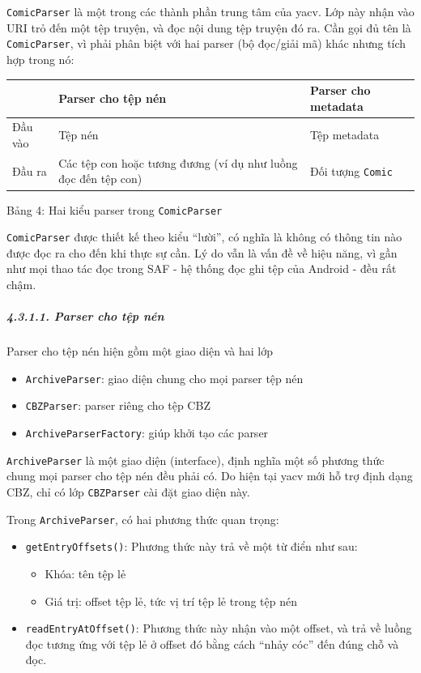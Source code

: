 \documentclass[
]{article}
\begin{document}
\texttt{ComicParser} là một trong các thành phần trung tâm của yacv. Lớp
này nhận vào URI trỏ đến một tệp truyện, và đọc nội dung tệp truyện đó
ra. Cần gọi đủ tên là \texttt{ComicParser}, vì phải phân biệt với hai
parser (bộ đọc/giải mã) khác nhưng tích hợp trong nó:

\begin{longtable}[]{@{}
  >{\raggedright\arraybackslash}p{}
  >{\raggedright\arraybackslash}p{}
  >{\raggedright\arraybackslash}p{}@{}}
\toprule
& Parser cho tệp nén & Parser cho metadata \\
\midrule
\endhead
Đầu vào & Tệp nén & Tệp metadata \\
Đầu ra & Các tệp con hoặc tương đương (ví dụ như luồng đọc đến tệp con)
& Đối tượng \texttt{Comic} \\
\bottomrule
\end{longtable}

Bảng 4: Hai kiểu parser trong \texttt{ComicParser}

\texttt{ComicParser} được thiết kế theo kiểu ``lười'', có nghĩa là không
có thông tin nào được đọc ra cho đến khi thực sự cần. Lý do vẫn là vấn
đề về hiệu năng, vì gần như mọi thao tác đọc trong SAF - hệ thống đọc
ghi tệp của Android - đều rất chậm.

\hypertarget{parser-cho-tux1ec7p-nuxe9n}{%
\subparagraph{4.3.1.1. Parser cho tệp
nén}\label{parser-cho-tux1ec7p-nuxe9n}}

Parser cho tệp nén hiện gồm một giao diện và hai lớp

\begin{itemize}
\item
  \texttt{ArchiveParser}: giao diện chung cho mọi parser tệp nén
\item
  \texttt{CBZParser}: parser riêng cho tệp CBZ
\item
  \texttt{ArchiveParserFactory}: giúp khởi tạo các parser
\end{itemize}

\texttt{ArchiveParser} là một giao diện (interface), định nghĩa một số
phương thức chung mọi parser cho tệp nén đều phải có. Do hiện tại yacv
mới hỗ trợ định dạng CBZ, chỉ có lớp \texttt{CBZParser} cài đặt giao
diện này.

Trong \texttt{ArchiveParser}, có hai phương thức quan trọng:

\begin{itemize}
\item
  \texttt{getEntryOffsets()}: Phương thức này trả về một từ điển như
  sau:

  \begin{itemize}
    \item
    Khóa: tên tệp lẻ
  \item
    Giá trị: offset tệp lẻ, tức vị trí tệp lẻ trong tệp nén
  \end{itemize}
\item
  \texttt{readEntryAtOffset()}: Phương thức này nhận vào một offset, và
  trả về luồng đọc tương ứng với tệp lẻ ở offset đó bằng cách ``nhảy
  cóc'' đến đúng chỗ và đọc.
\end{itemize}
\end{document}
